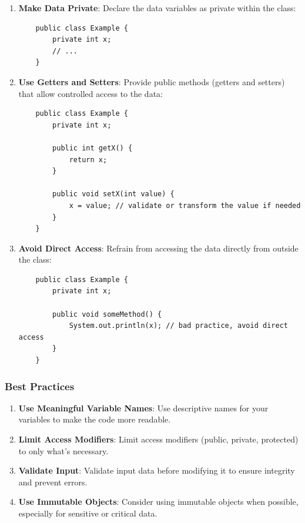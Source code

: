 \documentclass{book}
\begin{document}
\begin{enumerate}
	\item \textbf{Make Data Private}: Declare the data variables as private within the class:
	      \begin{verbatim}
    public class Example {
        private int x;
        // ...
    }
    \end{verbatim}

	\item \textbf{Use Getters and Setters}: Provide public methods (getters and setters) that allow controlled access to the data:
	      \begin{verbatim}
    public class Example {
        private int x;

        public int getX() {
            return x;
        }

        public void setX(int value) {
            x = value; // validate or transform the value if needed
        }
    }
    \end{verbatim}

	\item \textbf{Avoid Direct Access}: Refrain from accessing the data directly from outside the class:
	      \begin{verbatim}
    public class Example {
        private int x;

        public void someMethod() {
            System.out.println(x); // bad practice, avoid direct access
        }
    }
    \end{verbatim}
\end{enumerate}

\subsubsection{Best Practices}

\begin{enumerate}
	\item \textbf{Use Meaningful Variable Names}: Use descriptive names for your variables to make the code more readable.
	\item \textbf{Limit Access Modifiers}: Limit access modifiers (public, private, protected) to only what's necessary.
	\item \textbf{Validate Input}: Validate input data before modifying it to ensure integrity and prevent errors.
	\item \textbf{Use Immutable Objects}: Consider using immutable objects when possible, especially for sensitive or critical data.
\end{enumerate}
\end{document}

